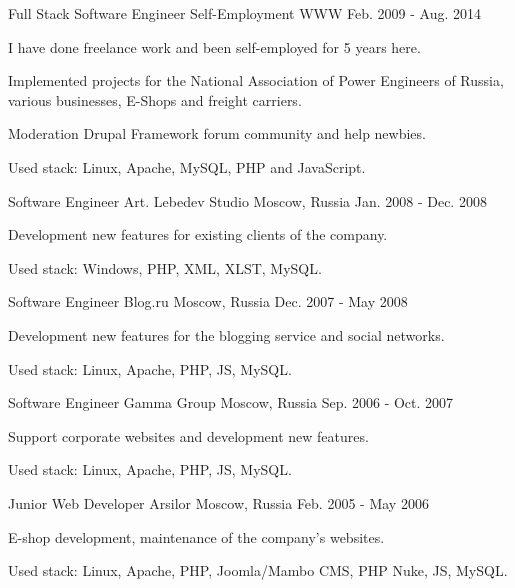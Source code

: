 \begin{cventries}
  \cventry
    {Full Stack Software Engineer}
    {Self-Employment}
    {WWW}
    {Feb. 2009 - Aug. 2014}
    {
      \begin{cvitems}
        \item {I have done freelance work and been self-employed for 5 years here.}
        \item {Implemented projects for the National Association of Power Engineers of Russia, various businesses, E-Shops and freight carriers.}
        \item {Moderation Drupal Framework forum community and help newbies.}
        \item {Used stack: Linux, Apache, MySQL, PHP and JavaScript.}
      \end{cvitems}
    }

  \cventry
    {Software Engineer}
    {Art. Lebedev Studio}
    {Moscow, Russia}
    {Jan. 2008 - Dec. 2008}
    {
      \begin{cvitems}
        \item {Development new features for existing clients of the company.}
        \item {Used stack: Windows, PHP, XML, XLST, MySQL.}
      \end{cvitems}
    }

  \cventry
    {Software Engineer}
    {Blog.ru}
    {Moscow, Russia}
    {Dec. 2007 - May 2008}
    {
      \begin{cvitems}
        \item {Development new features for the blogging service and social networks.}
        \item {Used stack: Linux, Apache, PHP, JS, MySQL.}
      \end{cvitems}
    }

  \cventry
    {Software Engineer}
    {Gamma Group}
    {Moscow, Russia}
    {Sep. 2006 - Oct. 2007}
    {
      \begin{cvitems}
        \item {Support corporate websites and development new features.}
        \item {Used stack: Linux, Apache, PHP, JS, MySQL.}
      \end{cvitems}
    }

  \cventry
    {Junior Web Developer}
    {Arsilor}
    {Moscow, Russia}
    {Feb. 2005 - May 2006}
    {
      \begin{cvitems}
        \item {E-shop development, maintenance of the company's websites.}
        \item {Used stack: Linux, Apache, PHP, Joomla/Mambo CMS, PHP Nuke, JS, MySQL.}
      \end{cvitems}
    }


\end{cventries}
